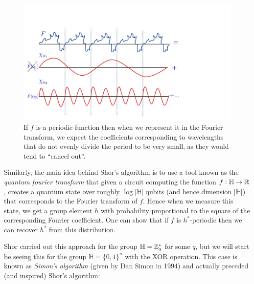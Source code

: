 \begin{figure}
\centering
\includegraphics[width=\textwidth, height=0.25\paperheight, keepaspectratio]{../figure/quantum_fourier.jpg}
\caption{If \(f\) is a periodic function then when we represent it in
the Fourier transform, we expect the coefficients corresponding to
wavelengths that do not evenly divide the period to be very small, as
they would tend to ``cancel out''.}
\label{tmplabelfig}
\end{figure}

Similarly, the main idea behind Shor's algorithm is to use a tool known
as the \emph{quantum fourier transform} that given a circuit computing
the function \(f:\mathbb{H}\rightarrow{\mathbb{R}}\), creates a quantum state over
roughly \(\log |\mathbb{H}|\) qubits (and hence dimension
\(|\mathbb{H}|\)) that corresponds to the Fourier transform of \(f\).
Hence when we measure this state, we get a group element \(h\) with
probability proportional to the square of the corresponding Fourier
coefficient. One can show that if \(f\) is \(h^*\)-periodic then we can
recover \(h^*\) from this distribution.

Shor carried out this approach for the group \(\mathbb{H}={\mathbb{Z}}^*_q\) for
some \(q\), but we will start be seeing this for the group
\(\mathbb{H} = \{0,1\}^n\) with the XOR operation. This case is known as
\emph{Simon's algorithm} (given by Dan Simon in 1994) and actually
preceded (and inspired) Shor's algorithm:

\hypertarget{simonsthm}{}

